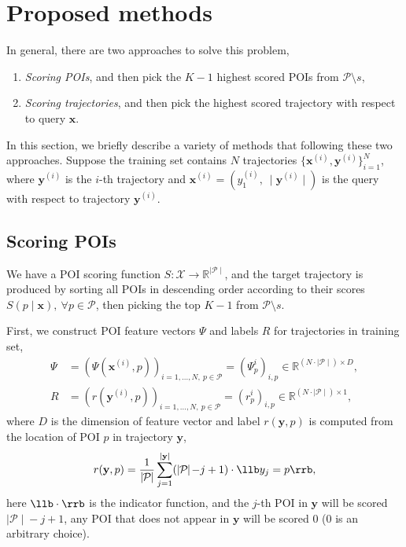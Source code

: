 \section{Proposed methods}
\label{sec:methods}

In general, there are two approaches to solve this problem,
\begin{enumerate}
\item \emph{Scoring POIs}, and then pick the $K-1$ highest scored POIs from $\mathcal{P} \setminus s$,
\item \emph{Scoring trajectories}, and then pick the highest scored trajectory with respect to query $\mathbf{x}$.
\end{enumerate}

In this section, we briefly describe a variety of methods that following these two approaches.
Suppose the training set contains $N$ trajectories 
$\{ \mathbf{x}^{(i)}, \mathbf{y}^{(i)} \}_{i=1}^N$,
where $\mathbf{y}^{(i)}$ is the $i$-th trajectory and $\mathbf{x}^{(i)} = (y_1^{(i)},~ \mid\!\! \mathbf{y}^{(i)} \!\!\mid)$ is the query 
with respect to trajectory $\mathbf{y}^{(i)}$.



\subsection{Scoring POIs}
\label{sec:scoring_point}

We have a POI scoring function $S: \mathcal{X} \to \mathbb{R}^{\mid \mathcal{P} \mid}$, 
and the target trajectory is produced by sorting all POIs in descending order according to their scores 
$S(p \mid \mathbf{x}),~ \forall p \in \mathcal{P}$,
then picking the top $K-1$ from $\mathcal{P} \setminus s$.

First, we construct POI feature vectors $\Psi$ and labels $R$ for trajectories in training set, 
\begin{align*}
\Psi &= \left( \Psi(\mathbf{x}^{(i)}, p) \right)_{i=1,\dots,N,~p \in \mathcal{P}} = \left( \Psi_p^i \right)_{i,p}
        \in \mathbb{R}^{(N \cdot \mid \mathcal{P} \mid) \times D}, \\
   R &= \left( r(\mathbf{y}^{(i)}, p) \right)_{i=1,\dots,N,~p \in \mathcal{P}} = \left(r_p^i \right)_{i,p}
        \in \mathbb{R}^{(N \cdot \mid \mathcal{P} \mid) \times 1},
\end{align*}
where $D$ is the dimension of feature vector and label $r(\mathbf{y}, p)$ is computed from the location of POI $p$ in trajectory $\mathbf{y}$,
\begin{equation*}
r(\mathbf{y}, p) = \frac{1}{\mid\!\! \mathcal{P} \!\!\mid} 
                   \sum_{j=1}^{\mid \mathbf{y} \mid} (\mid\!\! \mathcal{P} \!\!\mid\! - j + 1) \cdot \llb y_j = p \rrb,
\end{equation*}
here $\llb \cdot \rrb$ is the indicator function, and the $j$-th POI in $\mathbf{y}$ will be scored $\mid\!\! \mathcal{P} \!\!\mid\! - j + 1$, 
any POI that does not appear in $\mathbf{y}$ will be scored $0$ ($0$ is an arbitrary choice).



